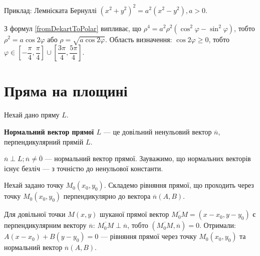 Приклад: Лемніската Бернуллі $(x^2 + y^2)^2 = a^2(x^2 - y^2), a > 0$.

\parbox{140px}{}
\parbox{7.2cm}{З формул \ref{fromDekartToPolar} випливає, що
	$\rho^4 = a^2\rho^2(\cos^2 \varphi - \sin^2 \varphi)$, тобто
	$\rho^2 = a\cos 2 \varphi$ або $\rho = \sqrt{a\cos 2 \varphi}$.
	Область визначення: $\cos 2\varphi \geqslant0$,
	тобто $\varphi \in \left[-\dfrac{\pi}{4}, \dfrac{\pi}{4}\right] \cup \left[\dfrac{3\pi}{4}, \dfrac{5\pi}{4}\right]$.
}

\section{Пряма на площині}

Нехай дано пряму $L$.

\begin{definition}
	\textbf{Нормальний вектор прямої $L$} --- це довільний ненульовий вектор $\overline{n}$, перпендикулярний прямій $L$.
\end{definition}

\noindent\parbox{2.8cm}{}
\parbox{\textwidth - 2.9cm}{
	$\overline{n} \perp L; \overline{n} \neq \overline{0}$ --- нормальний вектор прямої.
	Зауважимо, що нормальних векторів існує безліч --- з точністю до ненульової константи.
}

Нехай задано точку $M_0(x_0, y_0)$. Складемо рівняння прямої, що проходить
через точку $M_0(x_0, y_0)$ перпендикулярно до вектора $\overline{n}(A, B)$.

Для довільної точки $M(x, y)$ шуканої прямої вектор $\overline{M_0 M} = (x-x_0, y-y_0)$ є
перпендикулярним вектору $\overline{n}$: $\overline{M_0 M} \perp \overline{n}$, тобто $(\overline{M_0 M}, \overline{n}) = 0$. Отримали:
$A(x-x_0) + B(y-y_0) = 0$ --- рівняння прямої через точку $M_0(x_0, y_0)$ та нормальний вектор $\overline{n}(A, B)$.


